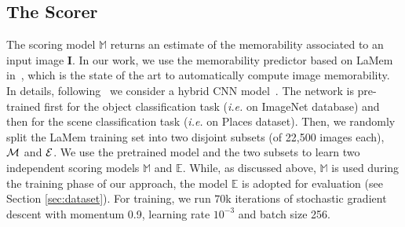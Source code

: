 \documentclass{sig-alternate-05-2015}
\begin{document}
\subsection{The Scorer}
\label{sec:scoring}

\begin{sloppypar}
The scoring model $\mathbb{M}$ returns an estimate of the memorability associated to an input image $\textbf{I}$. In our work, we use the memorability predictor based on LaMem in~\cite{khosla2015understanding}, which is the state of the art to automatically compute image memorability. In details, following~\cite{khosla2015understanding} we consider a hybrid CNN model~\cite{hybrydcnn}. The network is pre-trained first for the object classification task (\textit{i.e.} on ImageNet database) and then for the scene classification task (\textit{i.e.} on Places dataset). Then, we randomly split the LaMem {training set}%
into 
two disjoint subsets (of 22,500 images each), ${\cal M}$ and ${\cal E}$. We use the pretrained model and the two subsets to learn two independent scoring models $\mathbb{M}$ and $\mathbb{E}$. While, as discussed above, $\mathbb{M}$ is used during the training phase of our approach, the model $\mathbb{E}$ is adopted for evaluation (see Section \ref{sec:dataset}). For training, we run $70$k iterations of stochastic gradient descent with momentum 0.9, learning rate $10^{-3}$ and batch size 256. 
\end{sloppypar}

\end{document}
